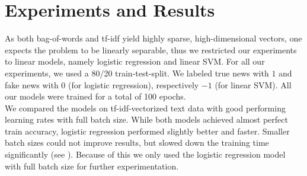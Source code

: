 \documentclass[10pt]{article}
\begin{document}
	
	\section{Experiments and Results}
	As both bag-of-words and tf-idf yield highly sparse, high-dimensional vectors, one expects the problem to be linearly separable, thus we restricted our experiments to linear models, namely logistic regression and linear SVM. For all our experiments, we used a 80/20 train-test-split. We labeled true news with $1$ and fake news with $0$ (for logistic regression), respectively $-1$ (for linear SVM). All our models were trained for a total of 100 epochs. \\
	\indent
	We compared the models on tf-idf-vectorized text data with good performing learning rates with full batch size. While both models achieved almost perfect train accuracy, logistic regression performed slightly better and faster. Smaller batch sizes could not improve results, but slowed down the training time significantly (see ). Because of this we only used the logistic regression model with full batch size for further experimentation. 
	
	
\end{document}
